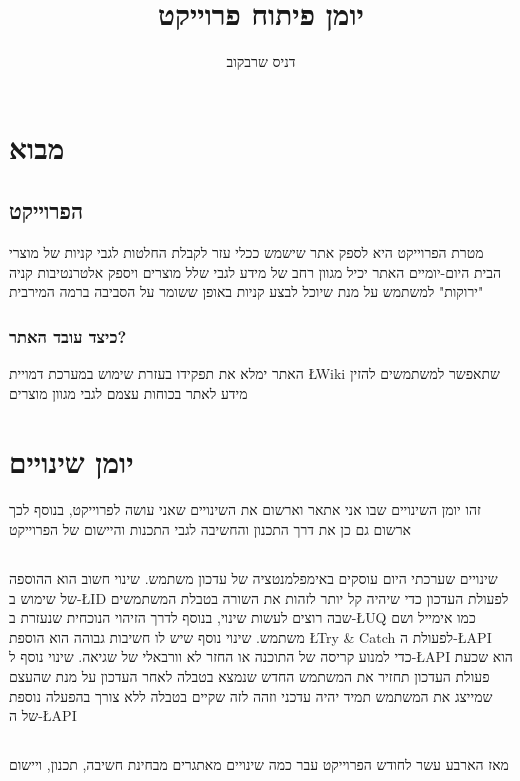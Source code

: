 \documentclass{report}
\title{יומן פיתוח פרוייקט}
\author{דניס שרבקוב}
\date{\displaydate{Initialcreation}}
\begin{document}
\maketitle

\tableofcontents

\newpage
\chapter{מבוא}
\section{הפרוייקט}
מטרת הפרוייקט היא לספק אתר שישמש ככלי עזר לקבלת החלטות לגבי קניות של מוצרי הבית היום-יומיים האתר יכיל מגוון רחב של מידע לגבי שלל מוצרים ויספק אלטרנטיבות קניה "ירוקות" למשתמש על מנת שיוכל לבצע קניות באופן ששומר על הסביבה ברמה המירבית
\subsection{כיצד עובד האתר?}
האתר ימלא את תפקידו בעזרת שימוש במערכת דמויית \L{Wiki} שתאפשר למשתמשים להזין מידע לאתר בכוחות עצמם לגבי מגוון מוצרים
\newpage

\chapter{יומן שינויים}
זהו יומן השינויים שבו אני אתאר וארשום את השינויים שאני עושה לפרוייקט, בנוסף לכך ארשום גם כן את דרך התכנון והחשיבה לגבי התכנות והיישום של הפרוייקט 

\section{\protect{}}

שינויים שערכתי היום עוסקים באימפלמנטציה של עדכון משתמש. שינוי חשוב הוא ההוספה של שימוש ב-\L{ID} לפעולת העדכון כדי שיהיה קל יותר לזהות את השורה בטבלת המשתמשים שבה רוצים לעשות שינוי, בנוסף לדרך הזיהוי הנוכחית שנעזרת ב-\L{UQ} כמו אימייל ושם משתמש. שינוי נוסף שיש לו חשיבות גבוהה הוא הוספת \L{Try \& Catch} לפעולת ה-\L{API} כדי למנוע קריסה של התוכנה או החזר לא וורבאלי של שגיאה. שינוי נוסף ל-\L{API} הוא שכעת פעולת העדכון תחזיר את המשתמש החדש שנמצא בטבלה לאחר העדכון על מנת שהעצם שמייצג את המשתמש תמיד יהיה עדכני וזהה לזה שקיים בטבלה ללא צורך בהפעלה נוספת של ה-\L{API}

\section{\protect{}}
מאז הארבע עשר לחודש הפרוייקט עבר כמה שינויים מאתגרים מבחינת חשיבה, תכנון, ויישום
\end{document}
